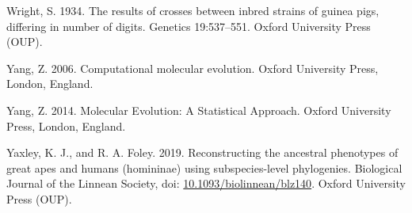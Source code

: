 \documentclass{article}
\newlength{\cslhangindent}
\newenvironment{CSLReferences}[2] %
 {\begin{list}{}{%
  \setlength{\itemindent}{0pt}
  \setlength{\leftmargin}{0pt}
  \setlength{\parsep}{0pt}
  \ifodd #1
   \setlength{\leftmargin}{\cslhangindent}
   \setlength{\itemindent}{-1\cslhangindent}
  \fi
  \setlength{\itemsep}{#2\baselineskip}}}
 {\end{list}}
\begin{document}
\begin{CSLReferences}{1}{0}
Wright, S. 1934. The results of crosses between inbred strains of guinea pigs, differing in number of digits. Genetics 19:537--551. Oxford University Press (OUP).

Yang, Z. 2006. Computational molecular evolution. Oxford University Press, London, England.

Yang, Z. 2014. Molecular {E}volution: A {S}tatistical {A}pproach. Oxford University Press, London, England.

Yaxley, K. J., and R. A. Foley. 2019. Reconstructing the ancestral phenotypes of great apes and humans (homininae) using subspecies-level phylogenies. Biological Journal of the Linnean Society, doi: \href{https://doi.org/10.1093/biolinnean/blz140}{10.1093/biolinnean/blz140}. Oxford University Press (OUP).

\end{CSLReferences}



\end{document}
